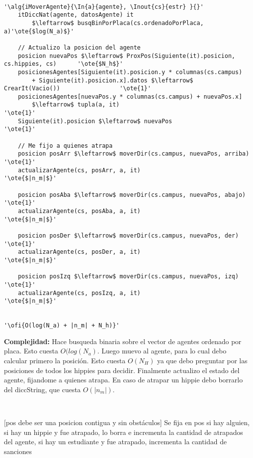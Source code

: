 ~

\begin{lstlisting}[mathescape]
'\alg{iMoverAgente}{\In{a}{agente}, \Inout{cs}{estr} }{}'
	itDiccNat(agente, datosAgente) it
		$\leftarrow$ busqBinPorPlaca(cs.ordenadoPorPlaca, a)'\ote{$log(N_a)$}'

	// Actualizo la posicion del agente
	posicion nuevaPos $\leftarrow$ ProxPos(Siguiente(it).posicion, cs.hippies, cs)		'\ote{$N_h$}'
	posicionesAgentes[Siguiente(it).posicion.y * columnas(cs.campus)
		+ Siguiente(it).posicion.x].datos $\leftarrow$ CrearIt(Vacio())					'\ote{1}'
	posicionesAgentes[nuevaPos.y * columnas(cs.campus) + nuevaPos.x]
		$\leftarrow$ tupla(a, it)												'\ote{1}'
	Siguiente(it).posicion $\leftarrow$ nuevaPos										'\ote{1}'

	// Me fijo a quienes atrapa
	posicion posArr $\leftarrow$ moverDir(cs.campus, nuevaPos, arriba)			'\ote{1}'
	actualizarAgente(cs, posArr, a, it) 										'\ote{$|n_m|$}'

	posicion posAba $\leftarrow$ moverDir(cs.campus, nuevaPos, abajo)			'\ote{1}'
	actualizarAgente(cs, posAba, a, it) 										'\ote{$|n_m|$}'

	posicion posDer $\leftarrow$ moverDir(cs.campus, nuevaPos, der)				'\ote{1}'
	actualizarAgente(cs, posDer, a, it) 										'\ote{$|n_m|$}'

	posicion posIzq $\leftarrow$ moverDir(cs.campus, nuevaPos, izq)				'\ote{1}'
	actualizarAgente(cs, posIzq, a, it) 										'\ote{$|n_m|$}'


'\ofi{O(log(N_a) + |n_m| + N_h)}'
\end{lstlisting}

\textbf{Complejidad:} Hace busqueda binaria sobre el vector de agentes ordenado por placa. Esto cuesta $O(log( N_a)$. Luego muevo al agente, para lo cual debo calcular primero la posición. Esto cuesta $O(N_H)$ ya que debo preguntar por las posiciones de todos los hippies para decidir. Finalmente actualizo el estado del agente, fijandome a quienes atrapa. En caso de atrapar un hippie debo borrarlo del diccString, que cuesta $O(|n_m|)$.

~


[pos debe ser una posicion contigua y sin obstáculos]
{Se fija en pos si hay alguien, si hay un hippie y fue atrapado, lo borra e incrementa la cantidad de atrapados del agente, si hay un estudiante y fue atrapado, incrementa la cantidad de sanciones}


